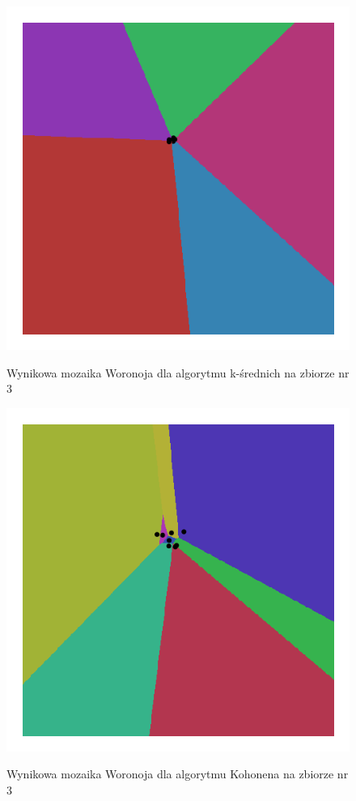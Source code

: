 \documentclass{classrep}
\begin{document}
\begin{figure}[h]
	\centering
		\includegraphics[scale=0.55]{pictures/kmeans_8_neuronow_zbior_2.png}
	\label{fig:kmeans_8_neuronow_zbior_2}
	\caption{Wynikowa mozaika Woronoja dla algorytmu k-średnich na zbiorze nr 3}
\end{figure}

\begin{figure}[h]
	\centering
		\includegraphics[scale=0.55]{pictures/kohonen_8_neuronow_zbior_2.png}
	\label{fig:kohonen_8_neuronow_zbior_2}
	\caption{Wynikowa mozaika Woronoja dla algorytmu Kohonena na zbiorze nr 3}
\end{figure}
\end{document}
